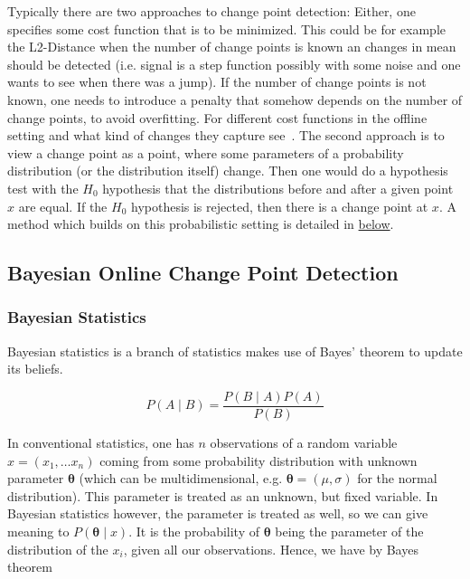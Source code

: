 \documentclass[12pt,a4paper]{article}
\begin{document}
Typically there are two approaches to change point detection: Either, one specifies some cost function that is to be minimized. This could be for example the L2-Distance when the number of change points is known an changes in mean should be detected (i.e. signal is a step function possibly with some noise and one wants to see when there was a jump). If the number of change points is not known, one needs to introduce a penalty that somehow depends on the number of change points, to avoid overfitting. For different cost functions in the offline setting and what kind of changes they capture see~\cite{Truong:Selectivereviewoffline}. The second approach is to view a change point as a point, where some parameters of a probability distribution (or the distribution itself) change. Then one would do a hypothesis test with the $H_0$ hypothesis that the distributions before and after a given point $x$ are equal. If the $H_0$ hypothesis is rejected, then there is a change point at $x$. A method which builds on this probabilistic setting is detailed in \protect\hyperlink{bayesian-online-changepoint-detection}{below}.

\hypertarget{bayesian-online-changepoint-detection}{
\subsection{Bayesian Online Change Point Detection}\label{bayesian-online-changepoint-detection}}

\subsubsection{Bayesian Statistics}
Bayesian statistics is a branch of statistics makes use of Bayes' theorem to update its beliefs.

\begin{equation*}
P\left(A \mid B\right)=\frac{P\left(B \mid A\right)P\left(A\right)}{P\left(B\right)}
\end{equation*}

In conventional statistics, one has $n$ observations of a random variable $ x = \left(x_1, \dots x_n\right)$ coming from some probability distribution with unknown parameter $\bm\theta$ (which can be multidimensional, e.g. $\bm\theta=\left(\mu, \sigma \right)$ for the normal distribution). This parameter is treated as an unknown, but fixed variable. In Bayesian statistics however, the parameter is treated as well, so we can give meaning to $P\left(\bm\theta \mid x\right)$. It is the probability of $\bm\theta$ being the parameter of the distribution of the $x_i$, given all our observations. Hence, we have by Bayes theorem
\end{document}
